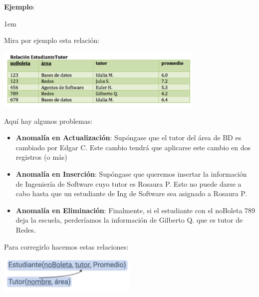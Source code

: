 \documentclass[12pt, fleqn]{report}                             %
\newenvironment{SmallIndentation}[1][0.75em]                    %
        {\begin{adjustwidth}{#1}{}\begin{footnotesize}}             %
        {\end{footnotesize}\end{adjustwidth}}                       %
\theoremstyle{break}                                            %
\begin{document}
                \textbf{Ejemplo}:
                \begin{SmallIndentation}[1em]
                    
                    Mira por ejemplo esta relación:
                    
                    \includegraphics[width=0.75\textwidth]{EjemploParaFNBC}

                    Aquí hay algunos problemas:
                    \begin{itemize}
                        \item
                            \textbf{Anomalía en Actualización}:
                            Supóngase que el tutor del área de BD es cambiado por Edgar C.
                            Este cambio tendrá que aplicarse este cambio en dos registros (o más)

                        \item
                            \textbf{Anomalía en Inserción}:
                            Supóngase que queremos insertar la información de Ingeniería de Software
                            cuyo tutor es Rosaura P. Esto no puede darse a cabo hasta que un
                            estudiante de Ing de Software sea asignado a Rosaura P.

                        \item
                            \textbf{Anomalía en Eliminación}:
                            Finalmente, si el estudiante con el noBoleta 789 deja la escuela, perderíamos
                            la información de Gilberto Q. que es tutor de Redes.
                    \end{itemize}

                    Para corregirlo hacemos estas relaciones:

                    \includegraphics[width=0.50\textwidth]{EjemploParaFNBC2}

                \end{SmallIndentation}
                    
\end{document}
